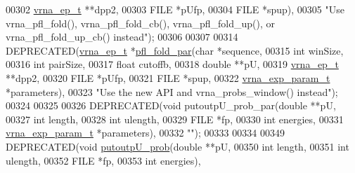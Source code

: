 \begin{DoxyCode}
00302                                \hyperlink{group__struct__utils_structvrna__elem__prob__s}{vrna\_ep\_t}     **dpp2,
00303                                FILE          *pUfp,
00304                                FILE          *spup),
00305 \textcolor{stringliteral}{"Use vrna\_pfl\_fold(), vrna\_pfl\_fold\_cb(), vrna\_pfl\_fold\_up(), or vrna\_pfl\_fold\_up\_cb() instead"});
00306 
00307 
00314 DEPRECATED(\hyperlink{group__struct__utils_structvrna__elem__prob__s}{vrna\_ep\_t} *\hyperlink{group__local__pf__fold_gaedf355f07b3d83bc93f98712132571b0}{pfl\_fold\_par}(\textcolor{keywordtype}{char}              *sequence,
00315                                       \textcolor{keywordtype}{int}               winSize,
00316                                       \textcolor{keywordtype}{int}               pairSize,
00317                                       \textcolor{keywordtype}{float}             cutoffb,
00318                                       \textcolor{keywordtype}{double}            **pU,
00319                                       \hyperlink{group__struct__utils_structvrna__elem__prob__s}{vrna\_ep\_t}         **dpp2,
00320                                       FILE              *pUfp,
00321                                       FILE              *spup,
00322                                       \hyperlink{group__energy__parameters_structvrna__exp__param__s}{vrna\_exp\_param\_t}  *parameters),
00323 \textcolor{stringliteral}{"Use the new API and vrna\_probs\_window() instead"});
00324 
00325 
00326 DEPRECATED(\textcolor{keywordtype}{void} putoutpU\_prob\_par(\textcolor{keywordtype}{double}            **pU,
00327                                   \textcolor{keywordtype}{int}               length,
00328                                   \textcolor{keywordtype}{int}               ulength,
00329                                   FILE              *fp,
00330                                   \textcolor{keywordtype}{int}               energies,
00331                                   \hyperlink{group__energy__parameters_structvrna__exp__param__s}{vrna\_exp\_param\_t}  *parameters),
00332 \textcolor{stringliteral}{""});
00333 
00334 
00349 DEPRECATED(\textcolor{keywordtype}{void}    \hyperlink{group__local__pf__fold_ga0bcb751860bbf34e3dfee8c2fbdb3ef3}{putoutpU\_prob}(\textcolor{keywordtype}{double} **pU,
00350                                  \textcolor{keywordtype}{int}    length,
00351                                  \textcolor{keywordtype}{int}    ulength,
00352                                  FILE   *fp,
00353                                  \textcolor{keywordtype}{int}    energies),

\end{DoxyCode}
